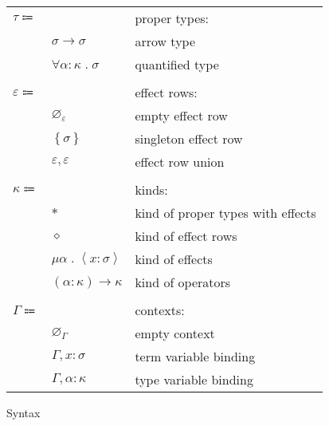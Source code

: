 \documentclass[12pt]{article}
\newcommand\anno[2]{#1 : #2} %
\newcommand\parens[1]{\left( #1 \right)} %
\newcommand\evar{x}
\newcommand\type{\sigma}
\newcommand\tvar{\alpha}
\newcommand\properType{\tau}
\newcommand\ptarrow[2]{#1 \rightarrow #2} %
\newcommand\ptforall[2]{\forall #1 \; . \; #2} %
\newcommand\row{\varepsilon}
\newcommand\rempty{\varnothing_{\row}}
\newcommand\rsingleton[1]{\left\{ #1 \right\}}
\newcommand\runion[2]{#1, #2}
\newcommand\kind{\kappa}
\newcommand\ktype{\ast}
\newcommand\krow{\diamond} %
\newcommand\keffect[3]{\mu #1 \; . \; \left\langle\anno{#2}{#3}\right\rangle} %
\newcommand\karrow[2]{\parens{#1} \rightarrow #2} %
\newcommand\context{\Gamma}
\newcommand\cempty{\varnothing_{\context}}
\newcommand\ceextend[2]{#1, #2}
\newcommand\csextend[2]{#1, #2}
\begin{document}
\begin{figure}
\begin{mdframed}[backgroundcolor=none]
\begin{center}
\begin{tabular}{l l l}
          $\properType \Coloneqq$ & & proper types: \\
          & $\ptarrow{\type}{\type}$ & arrow type \\
          & $\ptforall{\anno{\tvar}{\kind}}{\type}$ & quantified type \\
          \\
          $\row \Coloneqq$ & & effect rows: \\
          & $\rempty$ & empty effect row \\
          & $\rsingleton{\type}$ & singleton effect row \\
          & $\runion{\row}{\row}$ & effect row union \\
          \\
          $\kind \Coloneqq $ & & kinds: \\
          & $\ktype$ & kind of proper types with effects \\
          & $\krow$ & kind of effect rows \\
          & $\keffect{\tvar}{\evar}{\type}$ & kind of effects \\
          & $\karrow{\anno{\tvar}{\kind}}{\kind}$ & kind of operators \\
          \\
          $\context \Coloneqq$ & & contexts: \\
          & $\cempty$ & empty context \\
          & $\ceextend{\context}{\anno{\evar}{\type}}$ & term variable binding \\
          & $\csextend{\context}{\anno{\tvar}{\kind}}$ & type variable binding \\
        \end{tabular}
      \end{center}

      \caption{Syntax}\label{fig:syntax}
    \end{mdframed}
  \end{figure}
\end{document}
